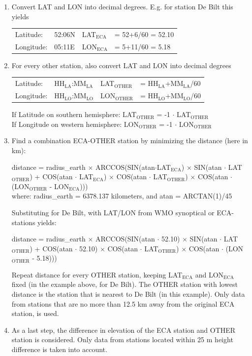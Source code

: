 \documentclass[a4paper,11pt]{article}
\begin{document}
\begin{enumerate}
\item Convert LAT and LON into decimal degrees. E.g. for station De
  Bilt this yields\\ 
\medskip

\begin{tabular}{l l l l}
Latitude:& 52:06N & LAT$_{\textrm{ECA}}$ &= 52+6/60 = 52.10\\
Longitude: &05:11E & LON$_{\textrm{ECA}}$ &= 5+11/60 = 5.18
\end{tabular}
\medskip

\item For every other station, also convert LAT and LON into decimal
degrees\\
\medskip

\begin{tabular}{l l l l}
Latitude: & HH$_{\textrm{LA}}$:MM$_{\textrm{LA}}$ &
LAT$_{\textrm{OTHER}}$ &= HH$_{\textrm{LA}}$+MM$_{\textrm{LA}}$/60\\
Longitude:& HH$_{\textrm{LO}}$:MM$_{\textrm{LO}}$ &
LON$_{\textrm{OTHER}}$ &= HH$_{\textrm{LO}}$+MM$_{\textrm{LO}}$/60
\end{tabular}
\medskip

If Latitude on southern hemisphere: LAT$_{\textrm{OTHER}}$ = -1 $\cdot$
LAT$_{\textrm{OTHER}}$\\
If Longitude on western hemisphere: LON$_{\textrm{OTHER}}$ = -1 $\cdot$ LON$_{\textrm{OTHER}}$
\medskip

\item Find a combination ECA-OTHER station by minimizing the distance
(here in km):
\medskip

 distance = radius\_earth $\times$
ARCCOS(SIN(atan$\cdot$LAT$_{\textrm{ECA}}$) $\times$
SIN(atan $\cdot$ LAT$_{\textrm{OTHER}}$) +
COS(atan $\cdot$ LAT$_{\textrm{ECA}}$) $\times$
COS(atan $\cdot$ LAT$_{\textrm{OTHER}}$) $\times$
COS(atan $\cdot$ (LON$_{\textrm{OTHER}}$ - LON$_{\textrm{ECA}}$)))\\
where: radius\_earth = 6378.137 kilometers, and atan = ARCTAN(1)/45
\medskip

Substituting for De Bilt, with LAT/LON from WMO synoptical or
ECA-stations yields:
\medskip

distance = radius\_earth $\times$
ARCCOS(SIN(atan $\cdot$ 52.10) $\times$
SIN(atan $\cdot$ LAT$_{\textrm{OTHER}}$) + COS(atan $\cdot$ 52.10) $\times$
COS(atan $\cdot$ LAT$_{\textrm{OTHER}}$) $\times$
COS(atan $\cdot$ (LON$_{\textrm{OTHER}}$ - 5.18)))
\medskip

Repeat distance for every OTHER station, keeping LAT$_{\textrm{ECA}}$
and LON$_{\textrm{ECA}}$ fixed (in the example above, for De
Bilt). The OTHER station with lowest distance is the station that is
nearest to De Bilt (in this example). Only data from stations that are
no more than 12.5 km away from the original ECA station, is used.

\item As a last step, the difference in elevation of the ECA station
  and OTHER station is considered. Only data from stations located
  within 25 m height difference is taken into account.
\end{enumerate}
\end{document}
